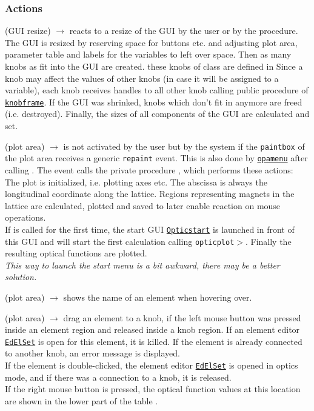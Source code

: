 \documentclass[12pt]{article}
\newcommand\code[1]{{\tt #1}}
\newcommand{\ofldx}[1]{\colorbox{black!15}{(#1)}}
\newcommand\guico[1]{{\color{blue}\code{#1}}}
\newcommand\guifco[1]{{\color{violet}\code{#1}}}
\newcommand{\unico}[1]{{\color{burntorange}\code{#1}}}
\newcommand{\evcodx}[2]{\ofldx{#1} $\rightarrow$ \guico{#2}}
\newcommand{\prcod}[2]{\opauni{#1}$>$\unico{#2}}
\newcommand{\opagui}[1]{\colorbox{blue!20}{\code{#1}}}
\newcommand{\ogui}[1]{\hyperref[#1]{\opagui{#1}}}
\newcommand{\opaguif}[1]{\colorbox{violet!30}{\code{#1}}}
\newcommand{\oguif}[1]{\hyperref[#1]{\opaguif{#1}}}
\newcommand{\opauni}[1]{\colorbox{orange!30}{\code{#1}}}
\newcommand{\act}[1]{\subsubsection*{Actions} #1}
\newcommand{\todo}[1]{{\color{red}\em #1}}
\begin{document}
\act{
\evcodx{GUI resize}{FormResize} reacts to a resize of the GUI by the user or by the \guico{Init} procedure. The GUI is resized by reserving space for buttons etc. and adjusting plot area, parameter table and labels for the variables to left over space.
Then as many knobs as fit into the GUI are created. these knobs of class 
\guifco{TKnob} are defined in   Since a knob may affect the values of other knobs (in case it will be assigned to a variable), each knob receives handles to all other knob calling public procedure \guifco{BrotherHandles} of \oguif{knobframe}. If the GUI was shrinked, knobs which don't fit in anymore are freed (i.e. destroyed). Finally, the sizes of all components of the GUI are calculated and set.

\evcodx{plot area}{pwpaint} is not activated by the user but by the system if the \code{paintbox} of the plot area receives a generic \code{repaint} event. This is also done by \ogui{opamenu} after calling \guico{Init}. The event calls the private procedure \guico{MakePlot}, which performs these actions:\\
The plot is initialized, i.e. plotting axes etc. The abscissa is always the longitudinal coordinate along the lattice. Regions representing magnets in the lattice are calculated, plotted and saved to later enable reaction on mouse operations.\\
If \guico{MakePlot} is called for the first time, the start GUI \ogui{Opticstart} is launched in front of this GUI and will start the first calculation calling \prcod{opticplot}{OpticCalc}. Finally the resulting optical functions are plotted.\\ \todo{This way to launch the start menu is a bit awkward, there may be a better solution.}

\evcodx{plot area}{pwMouseMove} shows the name of an element when hovering over.

\evcodx{plot area}{pwMouseDown, pwMouseUp} drag an element to a knob, if the left mouse button was pressed inside an element region and released inside a knob region. If an element editor \ogui{EdElSet} is open for this element, it is killed. If the element is already connected to another knob, an error message is displayed.\\
If the element is double-clicked, the element editor \ogui{EdElSet} is opened in optics mode, and if there was a connection to a knob, it is released.\\
If the right mouse button is pressed, the optical function values at this location are shown in the lower part of the table \guico{tab}.

}
\end{document}

